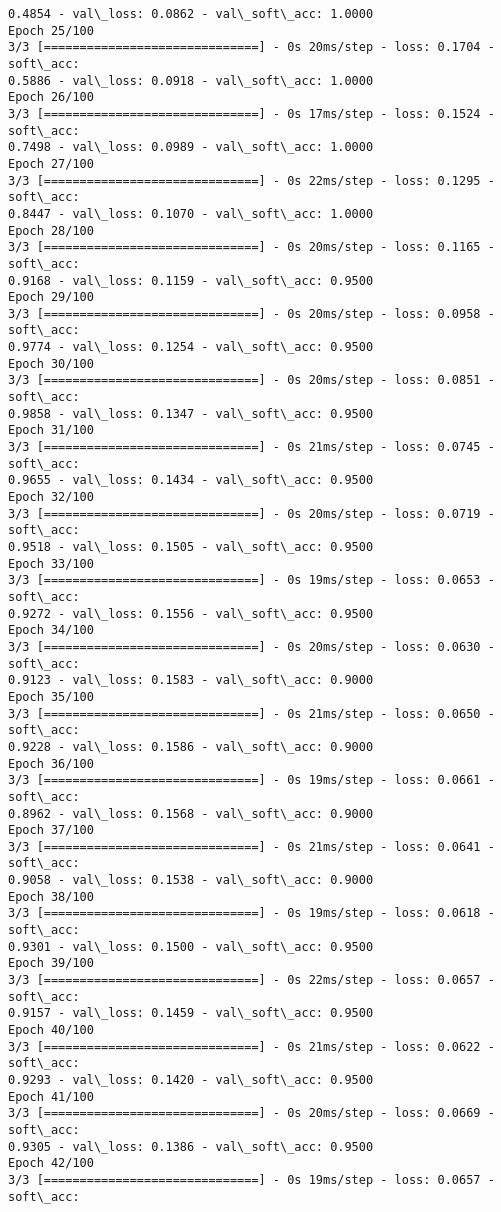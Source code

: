 \documentclass[11pt]{article}
\begin{document}
\begin{Verbatim}[commandchars=\\\{\}]
0.4854 - val\_loss: 0.0862 - val\_soft\_acc: 1.0000
Epoch 25/100
3/3 [==============================] - 0s 20ms/step - loss: 0.1704 - soft\_acc:
0.5886 - val\_loss: 0.0918 - val\_soft\_acc: 1.0000
Epoch 26/100
3/3 [==============================] - 0s 17ms/step - loss: 0.1524 - soft\_acc:
0.7498 - val\_loss: 0.0989 - val\_soft\_acc: 1.0000
Epoch 27/100
3/3 [==============================] - 0s 22ms/step - loss: 0.1295 - soft\_acc:
0.8447 - val\_loss: 0.1070 - val\_soft\_acc: 1.0000
Epoch 28/100
3/3 [==============================] - 0s 20ms/step - loss: 0.1165 - soft\_acc:
0.9168 - val\_loss: 0.1159 - val\_soft\_acc: 0.9500
Epoch 29/100
3/3 [==============================] - 0s 20ms/step - loss: 0.0958 - soft\_acc:
0.9774 - val\_loss: 0.1254 - val\_soft\_acc: 0.9500
Epoch 30/100
3/3 [==============================] - 0s 20ms/step - loss: 0.0851 - soft\_acc:
0.9858 - val\_loss: 0.1347 - val\_soft\_acc: 0.9500
Epoch 31/100
3/3 [==============================] - 0s 21ms/step - loss: 0.0745 - soft\_acc:
0.9655 - val\_loss: 0.1434 - val\_soft\_acc: 0.9500
Epoch 32/100
3/3 [==============================] - 0s 20ms/step - loss: 0.0719 - soft\_acc:
0.9518 - val\_loss: 0.1505 - val\_soft\_acc: 0.9500
Epoch 33/100
3/3 [==============================] - 0s 19ms/step - loss: 0.0653 - soft\_acc:
0.9272 - val\_loss: 0.1556 - val\_soft\_acc: 0.9500
Epoch 34/100
3/3 [==============================] - 0s 20ms/step - loss: 0.0630 - soft\_acc:
0.9123 - val\_loss: 0.1583 - val\_soft\_acc: 0.9000
Epoch 35/100
3/3 [==============================] - 0s 21ms/step - loss: 0.0650 - soft\_acc:
0.9228 - val\_loss: 0.1586 - val\_soft\_acc: 0.9000
Epoch 36/100
3/3 [==============================] - 0s 19ms/step - loss: 0.0661 - soft\_acc:
0.8962 - val\_loss: 0.1568 - val\_soft\_acc: 0.9000
Epoch 37/100
3/3 [==============================] - 0s 21ms/step - loss: 0.0641 - soft\_acc:
0.9058 - val\_loss: 0.1538 - val\_soft\_acc: 0.9000
Epoch 38/100
3/3 [==============================] - 0s 19ms/step - loss: 0.0618 - soft\_acc:
0.9301 - val\_loss: 0.1500 - val\_soft\_acc: 0.9500
Epoch 39/100
3/3 [==============================] - 0s 22ms/step - loss: 0.0657 - soft\_acc:
0.9157 - val\_loss: 0.1459 - val\_soft\_acc: 0.9500
Epoch 40/100
3/3 [==============================] - 0s 21ms/step - loss: 0.0622 - soft\_acc:
0.9293 - val\_loss: 0.1420 - val\_soft\_acc: 0.9500
Epoch 41/100
3/3 [==============================] - 0s 20ms/step - loss: 0.0669 - soft\_acc:
0.9305 - val\_loss: 0.1386 - val\_soft\_acc: 0.9500
Epoch 42/100
3/3 [==============================] - 0s 19ms/step - loss: 0.0657 - soft\_acc:

\end{Verbatim}
\end{document}
